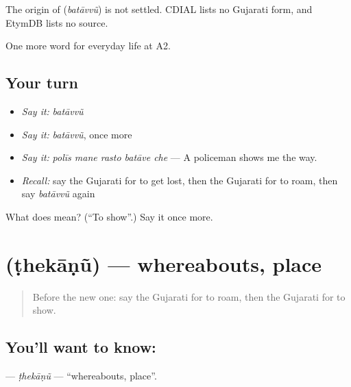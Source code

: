 \begin{cousinweb}
The origin of \textbf{} (\emph{batāvvũ}) is not settled. CDIAL lists no Gujarati form, and EtymDB lists no source.
\end{cousinweb}

\begin{grammarlens}[title={What you've built}]
One more word for everyday life at A2.
\end{grammarlens}

\subsection*{Your turn}
\begin{itemize}
\raggedright
  \item \emph{Say it:} \emph{batāvvũ}
  \item \emph{Say it:} \emph{batāvvũ}, once more
  \item \emph{Say it:} \emph{polīs mane rasto batāve che} — A policeman shows me the way.
  \item \emph{Recall:} say the Gujarati for to get lost, then the Gujarati for to roam, then say \emph{batāvvũ} again
\end{itemize}

\begin{tcolorbox}[breakable,colback=teal!4,colframe=teal!35!black,title={Before you move on}]
What does  mean? (\textquotedblleft{}To show\textquotedblright{}.) Say it once more.
\end{tcolorbox}
\section[\texorpdfstring{\gu{ઠેકાણું} (ṭhekāṇũ)}{ઠેકાણું (ṭhekāṇũ)}]{ (ṭhekāṇũ) — whereabouts, place}

\label{lesson:GU-C195-thekanu}



\begin{quote}
Before the new one: say the Gujarati for to roam, then the Gujarati for to show.
\end{quote}

\subsection*{You'll want to know: }
\textbf{} — \emph{ṭhekāṇũ} — \textquotedblleft{}whereabouts, place\textquotedblright{}.

